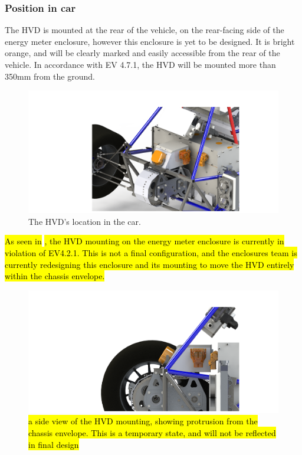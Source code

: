 \documentclass{article}
\DeclareRobustCommand{\hlr}[1]{{\sethlcolor{pink}\hl{#1}}}
\begin{document}
\subsubsection{Position in car}
The HVD is mounted at the rear of the vehicle, on the rear-facing side of the energy meter enclosure, however this enclosure is yet to be designed. It is bright orange, and will be clearly marked and easily accessible from the rear of the vehicle. In accordance with EV 4.7.1, the HVD will be mounted more than 350mm from the ground.  

\begin{figure}[H]
\centering
\includegraphics[width=.75\textwidth]{EnergyMeterBackISO}
\caption{The HVD's location in the car.}
\label{fig:hvd}
\end{figure}

\hlr{As seen in} \hl{, the HVD mounting on the energy meter enclosure is currently in violation of EV4.2.1. This is not a final configuration, and the enclosures team is currently redesigning this enclosure and its mounting to move the HVD entirely within the chassis envelope.}

 \begin{figure}[H]
\centering
\includegraphics[width=.75\textwidth]{EnergyMeterBackOfCar}
\caption{\hlr{a side view of the HVD mounting, showing protrusion from the chassis envelope. This is a temporary state, and will not be reflected in final design}}
\label{fig:hvd_side}
\end{figure}
\end{document}
